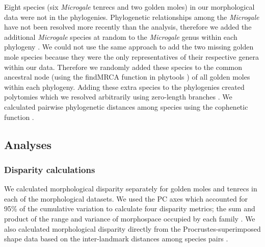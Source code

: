 \documentclass[12pt,a4paper]{article}
\begin{document}
	Eight species (six \textit{Microgale} tenrecs and two golden moles) in our morphological data were not in the phylogenies. Phylogenetic relationships among the \textit{Microgale} have not been resolved more recently than the \citep{Kuhn2011} analysis, therefore we added the additional \textit{Microgale} species at random to the \textit{Microgale} genus within each phylogeny \citep{Revell2012}. We could not use the same approach to add the two missing golden mole species because they were the only representatives of their respective genera within our data. Therefore we randomly added these species to the common ancestral node (using the findMRCA function in phytools \citep{Revell2012}) of all golden moles within each phylogeny. Adding these extra species to the phylogenies created polytomies which we resolved arbitrarily using zero-length branches \citep{Paradis2004}. We calculated pairwise phylogenetic distances among species using the cophenetic function \citep[R Development Core][]{Team2013}. 
	
\subsection{Analyses}
\subsubsection{Disparity calculations} 

	We calculated morphological disparity separately for golden moles and tenrecs in each of the morphological datasets. We used the PC axes which accounted for 95\% of the cumulative variation to calculate four disparity metrics; the sum and product of the range and variance of morphospace occupied by each family \citep{Brusatte2008, Foth2012, Ruta2013}. We also calculated morphological disparity directly from the Procrustes-superimposed shape data based on the inter-landmark distances among species pairs \citep[ZelditchMD,][]{Zelditch2012}. 
\end{document}
